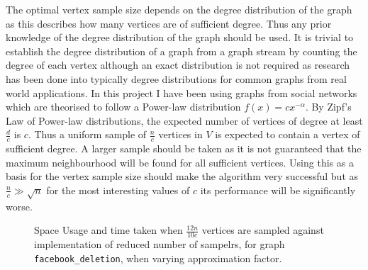 \documentclass[11pt,twoside,a4paper]{report}
\begin{document}
\par The optimal vertex sample size depends on the degree distribution of the graph as this describes how many vertices are of sufficient degree. Thus any prior knowledge of the degree distribution of the graph should be used. It is trivial to establish the degree distribution of a graph from a graph stream by counting the degree of each vertex although an exact distribution is not required as research has been done into typically degree distributions for common graphs from real world applications. In this project I have been using graphs from social networks which are theorised \cite{socialNetworkDistribution} to follow a Power-law distribution $f(x)=cx^{-\alpha}$. By Zipf's Law of Power-law distributions, the expected number of vertices of degree at least $\frac{d}{c}$ is $c$. Thus a uniform sample of $\frac{n}c$ vertices in $V$ is expected to contain a vertex of sufficient degree. A larger sample should be taken as it is not guaranteed that the maximum neighbourhood will be found for all sufficient vertices. Using this as a basis for the vertex sample size should make the algorithm very successful but as $\frac{n}c\gg\sqrt{n}$ for the most interesting values of $c$ its performance will be significantly worse.

\begin{figure}[H]
	\label{Figure 17}
	\caption{Space Usage and time taken when $\frac{12n}{10c}$ vertices are sampled against implementation of reduced number of sampelrs, for graph \texttt{facebook\_deletion}, when varying approximation factor.}
\end{figure}
\end{document}
